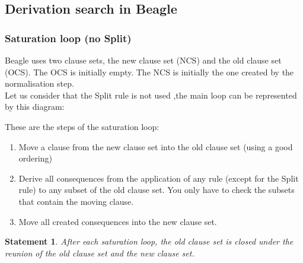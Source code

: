\documentclass[a4paper, 11pt]{article}
\theoremstyle{plain}
\newtheorem*{stat}{Statement}
\theoremstyle{definition}
\theoremstyle{remark}
\begin{document}
\subsection{Derivation search in Beagle}
\subsubsection{Saturation loop (no Split)} 
Beagle uses two clause sets, the new clause set (NCS) and the old clause set (OCS). The OCS is initially empty. The NCS is initially the one created by the normalisation step.
\\Let us consider that the Split rule is not used ,the main loop can be represented by this diagram:
  
  
These are the steps of the saturation loop:  
\begin{enumerate}  
\item  Move a clause from the new clause set into the old clause set (using a good ordering)
\item  Derive all consequences from the application of any rule (except for the Split rule) to any subset of the old clause set. You only have to check the subsets that contain the moving clause.
\item Move all created consequences into the new clause set.
\end{enumerate}

\begin{stat}
After each saturation loop, the old clause set is closed under 
the reunion of the old clause set and the new clause set.
\end{stat} 
\end{document}
